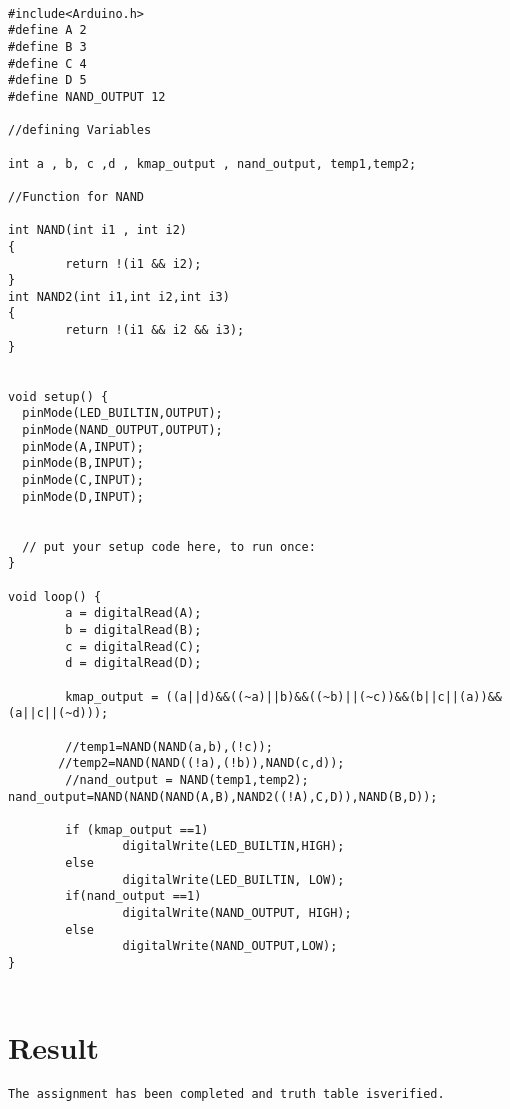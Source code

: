 \documentclass{article}
\begin{document}
\begin{verbatim}

#include<Arduino.h>
#define A 2
#define B 3
#define C 4
#define D 5
#define NAND_OUTPUT 12

//defining Variables

int a , b, c ,d , kmap_output , nand_output, temp1,temp2;

//Function for NAND

int NAND(int i1 , int i2)
{
        return !(i1 && i2); 
}
int NAND2(int i1,int i2,int i3)
{
        return !(i1 && i2 && i3); 
}


void setup() {
  pinMode(LED_BUILTIN,OUTPUT);
  pinMode(NAND_OUTPUT,OUTPUT);
  pinMode(A,INPUT);
  pinMode(B,INPUT);
  pinMode(C,INPUT);
  pinMode(D,INPUT);


  // put your setup code here, to run once:
}

void loop() {
        a = digitalRead(A);
        b = digitalRead(B);
        c = digitalRead(C);
        d = digitalRead(D);

        kmap_output = ((a||d)&&((~a)||b)&&((~b)||(~c))&&(b||c||(a))&&(a||c||(~d)));

        //temp1=NAND(NAND(a,b),(!c));
       //temp2=NAND(NAND((!a),(!b)),NAND(c,d));
        //nand_output = NAND(temp1,temp2);
nand_output=NAND(NAND(NAND(A,B),NAND2((!A),C,D)),NAND(B,D));

        if (kmap_output ==1)
                digitalWrite(LED_BUILTIN,HIGH);
        else
                digitalWrite(LED_BUILTIN, LOW);
        if(nand_output ==1)
                digitalWrite(NAND_OUTPUT, HIGH);
        else
                digitalWrite(NAND_OUTPUT,LOW);
}


\end{verbatim}

\section{Result}

\begin{verbatim}
The assignment has been completed and truth table isverified.
\end{verbatim}
\end{document}
